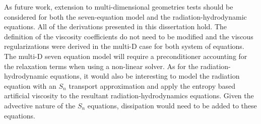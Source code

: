 As future work, extension to multi-dimensional geometries tests should be considered for both the seven-equation model and the radiation-hydrodynamic equations. 
All of the derivations presented in this dissertation hold. The definition of the viscosity coefficients do not need to be modified and the viscous regularizations were derived in the multi-D case for both system of equations. The multi-D seven equation model will require a preconditioner accounting for the relaxation terms when using a non-linear solver. As for the radiation-hydrodynamic equations, it would also be interesting to model the radiation equation with an $S_n$ transport approximation and apply the entropy based artificial viscosity to the resultant radiation-hydrodynamics equations. Given the advective nature of the $S_n$ equations, dissipation would need to be added to these equations.